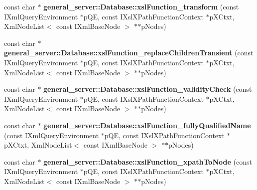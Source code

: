 \begin{DoxyCompactItemize}
\item 
\hypertarget{group__XSLModule-Functions_ga5686f41efe106ab663c420a842cd3a42}{const char $\ast$ {\bfseries general\-\_\-server\-::\-Database\-::xsl\-Function\-\_\-transform} (const \-I\-Xml\-Query\-Environment $\ast$p\-Q\-E, const \-I\-Xsl\-X\-Path\-Function\-Context $\ast$p\-X\-Ctxt, \-Xml\-Node\-List$<$ const \-I\-Xml\-Base\-Node $>$ $\ast$$\ast$p\-Nodes)}\label{group__XSLModule-Functions_ga5686f41efe106ab663c420a842cd3a42}

\item 
\hypertarget{group__XSLModule-Functions_ga487c83352982d590ab17ebfc8dfee68a}{const char $\ast$ {\bfseries general\-\_\-server\-::\-Database\-::xsl\-Function\-\_\-replace\-Children\-Transient} (const \-I\-Xml\-Query\-Environment $\ast$p\-Q\-E, const \-I\-Xsl\-X\-Path\-Function\-Context $\ast$p\-X\-Ctxt, \-Xml\-Node\-List$<$ const \-I\-Xml\-Base\-Node $>$ $\ast$$\ast$p\-Nodes)}\label{group__XSLModule-Functions_ga487c83352982d590ab17ebfc8dfee68a}

\item 
\hypertarget{group__XSLModule-Functions_ga2ab329bca4a2cd95499e13553f9bd152}{const char $\ast$ {\bfseries general\-\_\-server\-::\-Database\-::xsl\-Function\-\_\-validity\-Check} (const \-I\-Xml\-Query\-Environment $\ast$p\-Q\-E, const \-I\-Xsl\-X\-Path\-Function\-Context $\ast$p\-X\-Ctxt, \-Xml\-Node\-List$<$ const \-I\-Xml\-Base\-Node $>$ $\ast$$\ast$p\-Nodes)}\label{group__XSLModule-Functions_ga2ab329bca4a2cd95499e13553f9bd152}

\item 
\hypertarget{group__XSLModule-Functions_ga3cf5d513d5e1e0e31391fbb197934944}{const char $\ast$ {\bfseries general\-\_\-server\-::\-Database\-::xsl\-Function\-\_\-fully\-Qualified\-Name} (const \-I\-Xml\-Query\-Environment $\ast$p\-Q\-E, const \-I\-Xsl\-X\-Path\-Function\-Context $\ast$p\-X\-Ctxt, \-Xml\-Node\-List$<$ const \-I\-Xml\-Base\-Node $>$ $\ast$$\ast$p\-Nodes)}\label{group__XSLModule-Functions_ga3cf5d513d5e1e0e31391fbb197934944}

\item 
\hypertarget{group__XSLModule-Functions_ga1946b08e504e5adf6a47800e1aae343c}{const char $\ast$ {\bfseries general\-\_\-server\-::\-Database\-::xsl\-Function\-\_\-xpath\-To\-Node} (const \-I\-Xml\-Query\-Environment $\ast$p\-Q\-E, const \-I\-Xsl\-X\-Path\-Function\-Context $\ast$p\-X\-Ctxt, \-Xml\-Node\-List$<$ const \-I\-Xml\-Base\-Node $>$ $\ast$$\ast$p\-Nodes)}\label{group__XSLModule-Functions_ga1946b08e504e5adf6a47800e1aae343c}


\end{DoxyCompactItemize}
